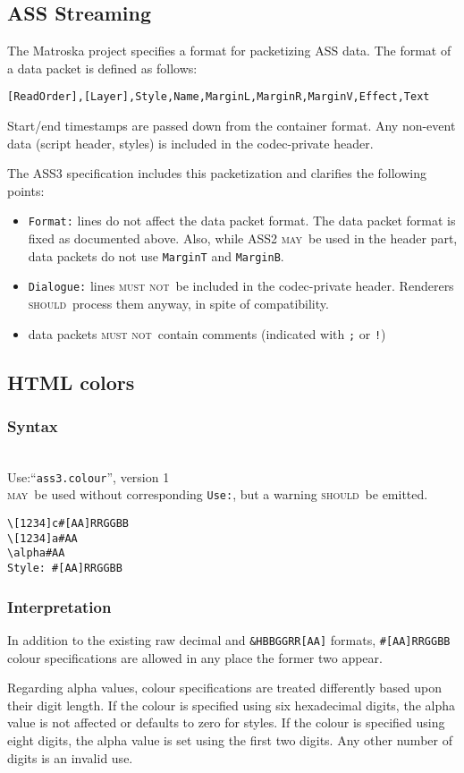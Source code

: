 \documentclass[11pt,a4paper]{article}
\newcommand{\may}{\textsc{may}}
\newcommand{\should}{\textsc{should}}
\newcommand{\mustnot}{\textsc{must not}}
\newcommand{\syntax}[1]{
	\subsubsection*{Syntax}
	\begin{tabbing}
	\hspace{2cm}\=\\[-16pt]
	#1
	\end{tabbing}
}
\newcommand{\mayuse}{\may\ be used without corresponding \texttt{Use:},
	but a warning \should\ be emitted.}
\newcommand{\usespec}[3]{Use:\>``\texttt{#1}'', version #2\\\> #3}
\begin{document}
\subsection{ASS Streaming}
The Matroska project\cite{mkv} specifies a format for packetizing ASS data.
The format of a data packet is defined as follows:

\begin{verbatim}
[ReadOrder],[Layer],Style,Name,MarginL,MarginR,MarginV,Effect,Text
\end{verbatim}

Start/end timestamps are passed down from the container format. Any non-event
data (script header, styles) is included in the codec-private header.

The ASS3 specification includes this packetization and clarifies the following
points:
\begin{itemize}
\item \texttt{Format:} lines do not affect the data packet format.
The data packet format is fixed as documented above. Also, while ASS2 \may\ 
be used in the header part, data packets do not use \texttt{MarginT} and
\texttt{MarginB}.
\item \texttt{Dialogue:} lines \mustnot\ be included in the codec-private
header. Renderers \should\ process them anyway, in spite of compatibility.
\item data packets \mustnot\ contain comments (indicated with \verb!;! or
\verb;!;)
\end{itemize}

\subsection{HTML colors}
\syntax{\usespec{ass3.colour}{1}{\mayuse}}

\begin{verbatim}
\[1234]c#[AA]RRGGBB
\[1234]a#AA
\alpha#AA
Style: #[AA]RRGGBB
\end{verbatim}

\subsubsection*{Interpretation}
In addition to the existing raw decimal and \verb!&HBBGGRR[AA]! formats,
\verb!#[AA]RRGGBB! colour specifications are allowed in any
place the former two appear.

Regarding alpha values, colour specifications are treated differently
based upon their digit length. If the colour is specified using six
hexadecimal digits, the alpha value is not affected or defaults to zero
for styles. If the colour is specified using eight digits, the alpha
value is set using the first two digits. Any other number of digits
is an invalid use.
\end{document}
